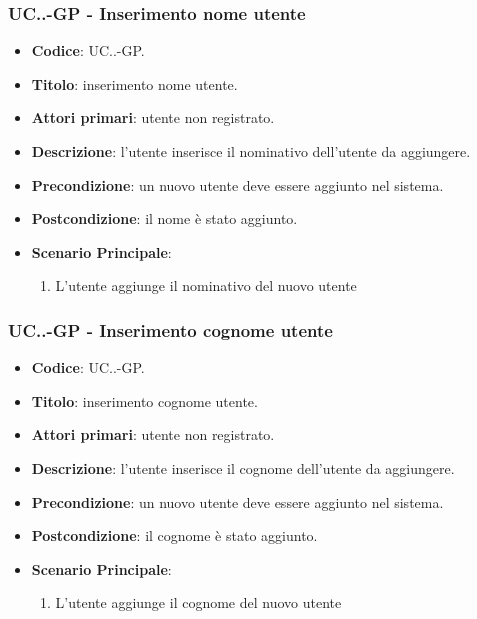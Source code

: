 		\subsubsection{UC\theuccount.\thesubuccount.\thesubsubuccount-GP - Inserimento nome utente}
			
			\begin{itemize}
				\item \textbf{Codice}: UC\theuccount.\thesubuccount.\thesubsubuccount-GP.
				\item \textbf{Titolo}: inserimento nome utente.
				\item \textbf{Attori primari}: utente non registrato.
				\item \textbf{Descrizione}: l'utente inserisce il nominativo dell'utente da aggiungere.
				\item \textbf{Precondizione}: un nuovo utente deve essere aggiunto nel sistema.
				\item \textbf{Postcondizione}: il nome è stato aggiunto.
				\item \textbf{Scenario Principale}:
				\begin{enumerate}
					\item L'utente aggiunge il nominativo del nuovo utente
				\end{enumerate}
			\end{itemize}
		
		\subsubsection{UC\theuccount.\thesubuccount.\thesubsubuccount-GP - Inserimento cognome utente}
			
			\begin{itemize}
				\item \textbf{Codice}: UC\theuccount.\thesubuccount.\thesubsubuccount-GP.
				\item \textbf{Titolo}: inserimento cognome utente.
				\item \textbf{Attori primari}: utente non registrato.
				\item \textbf{Descrizione}: l'utente inserisce il cognome dell'utente da aggiungere.
				\item \textbf{Precondizione}: un nuovo utente deve essere aggiunto nel sistema.
				\item \textbf{Postcondizione}: il cognome è stato aggiunto.
				\item \textbf{Scenario Principale}:
				\begin{enumerate}
					\item L'utente aggiunge il cognome del nuovo utente
				\end{enumerate}
			\end{itemize}
		

